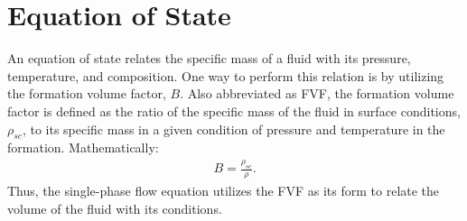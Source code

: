 \section{Equation of State}

An equation of state relates the specific mass of a fluid with its pressure, temperature, and composition. One way to perform this relation is by utilizing the formation volume factor, $B$. Also abbreviated as FVF, the formation volume factor is defined as the ratio of the specific mass of the fluid in surface conditions, $\rho_{sc}$, to its specific mass in a given condition of pressure and temperature in the formation. Mathematically:
	\begin{align}
	\label{eq:12}
	B=\frac{\rho_{sc}}{\rho}.
	\end{align}
Thus, the single-phase flow equation utilizes the FVF as its form to relate the volume of the fluid with its conditions.

